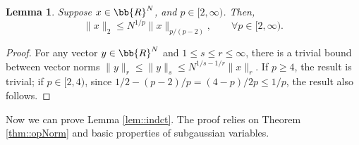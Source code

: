 \documentclass[12pt]{article}%
\theoremstyle{plain}%
\newtheorem{lem}{Lemma}[section]
\theoremstyle{remark}
\begin{document}
\begin{lem}\label{lem::simpleNormBound}
Suppose $x \in \bb{R}^N$, and $p \in [2,\infty)$. Then, 
\begin{equation*}
\| x \|_2 \le N^{1/p} \| x \|_{p/(p-2)}, \qquad \forall p \in [2,\infty).
\end{equation*}
\end{lem}
\begin{proof}
For any vector $y \in \bb{R}^N$ and $1 \le s \le r \le \infty$, there is a trivial bound between vector norms $\| y \|_r \le \| y \|_s \le N^{1/s - 1/r} \| x \|_r$. If $p \ge 4$, the result is trivial; if $p \in [2,4)$, since $1/2 - (p-2)/p = (4-p)/2p \le 1/p$, the result also follows.
\end{proof}

Now we can prove Lemma \ref{lem::indct}. The proof relies on Theorem \ref{thm::opNorm} and basic properties of subgaussian variables.
\end{document}
